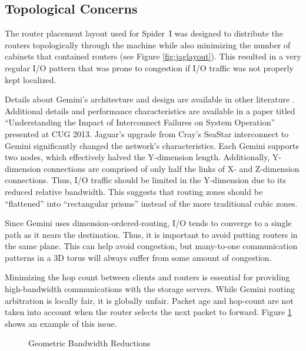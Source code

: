 \subsection{Topological Concerns}
\label{sec:topo}

The router placement layout used for Spider~I was designed to distribute the
routers topologically through the machine while also minimizing the number of
cabinets that contained routers (see Figure \ref{fig:jaglayout}). This resulted
in a very regular I/O pattern that was prone to congestion if I/O traffic was
not properly kept localized.

Details about Gemini's architecture and design are available in other
literature \cite{hoti}.  Additional details and performance characteristics are
available in a paper titled ``Understanding the Impact of Interconnect Failures
on System Operation'' \cite{interconnect} presented at CUG 2013.  Jaguar's
upgrade from Cray's SeaStar interconnect to Gemini significantly changed the
network's characteristics.  Each Gemini supports two nodes, which effectively
halved the Y-dimension length.  Additionally, Y-dimension connections are
comprised of only half the links of X- and Z-dimension connections.  Thus, I/O
traffic should be limited in the Y-dimension due to its reduced relative
bandwidth.  This suggests that routing zones should be ``flattened'' into
``rectangular prisms'' instead of the more traditional cubic zones.

Since Gemini uses dimension-ordered-routing, I/O tends to converge to a single
path as it nears the destination.  Thus, it is important to avoid putting
routers in the same plane.  This can help avoid congestion, but many-to-one
communication patterns in a 3D torus will always suffer from some amount of
congestion.

Minimizing the hop count between clients and routers is essential for providing
high-bandwidth communications with the storage servers.  While Gemini routing
arbitration is locally fair, it is globally unfair.  Packet age and hop-count
are not taken into account when the router selects the next packet to forward.
Figure \ref{fig:geombw} shows an example of this issue.

\begin{figure}[h]
  \centering
  
  \caption{Geometric Bandwidth Reductions}\label{fig:geombw}
\end{figure}

